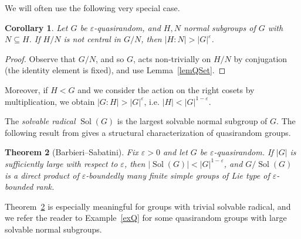 \documentclass[11pt,reqno]{amsart}
\numberwithin{equation}{section}
\newtheorem{theorem}{Theorem}[section]
\newtheorem{corollary}[theorem]{Corollary}
\theoremstyle{definition}
\theoremstyle{remark}
\newcommand{\Sol}{\mathop{\mathrm{Sol}}}
\begin{document}
We will often use the following very special case.

\begin{corollary} \label{corQChief}
Let $G$ be $\varepsilon$-quasirandom, and $H,N$ normal subgroups of $G$ with $N \subseteq H$.
If $H/N$ is not central in $G/N$,
then $|H:N| > |G|^\varepsilon$.
\end{corollary}
\begin{proof}
Observe that $G/N$, and so $G$, acts non-trivially on $H/N$ by conjugation
(the identity element is fixed), and use Lemma~\ref{lemQSet}.
\end{proof}

Moreover, if $H<G$ and we consider the action on the right cosets by multiplication,
we obtain $|G:H|>|G|^\varepsilon$, i.e. $|H| < |G|^{1-\varepsilon}$.

The \emph{solvable radical} $\Sol(G)$ is the largest solvable normal subgroup of $G$.
The following result from \cite{BS25} gives a structural characterization of quasirandom groups.

\begin{theorem}[Barbieri--Sabatini] \label{thBS}
Fix $\varepsilon>0$ and let $G$ be $\varepsilon$-quasirandom.
If $|G|$ is sufficiently large with respect to $\varepsilon$, then $|\Sol(G)| < |G|^{1-\varepsilon}$,
and $G/\Sol(G)$ is a direct product of $\varepsilon$-boundedly many finite simple groups
of Lie type of $\varepsilon$-bounded rank.
\end{theorem}

Theorem~\ref{thBS} is especially meaningful for groups with trivial solvable radical,
and we refer the reader to Example~\ref{exQ} for some quasirandom groups with large solvable normal subgroups.
\end{document}

